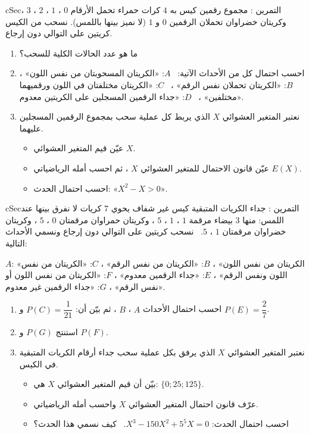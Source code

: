 \documentclass[12pt,a4paper]{article}
\newenvironment{BOX}[2]{\begin{otherlanguage}{english}\begin{arbox}{#1}{#2}}{\end{arbox}\end{otherlanguage}}
\newcounter{exo}
\newenvironment{tamrin}[1]{\stepcounter{exo}\begin{BOX}{cSec}{التمرين \theexo: #1}}{\end{BOX}}
\newenvironment{sq}{\begin{itemize}[leftmargin=2.4em,itemsep=3pt]}{\end{itemize}}
\newcommand{\qa}{\item[(أ)]}\newcommand{\qb}{\item[(ب)]}\newcommand{\qc}{\item[(جـ)]}\newcommand{\qd}{\item[(د)]}\newcommand{\qe}{\item[(هـ)]}
\begin{document}
\begin{tamrin}{مجموع رقمين}
كيس به $4$ كرات حمراء تحمل الأرقام $0$ ، $1$ ، $2$ ، $3$ ، وكريتان خضراوان تحملان الرقمين $0$ و $1$ (لا نميز بينها باللمس). نسحب من الكيس كريتين على التوالي دون إرجاع.
\begin{enumerate}
\item ما هو عدد الحالات الكلية للسحب؟
\item احسب احتمال كل من الأحداث الآتية: \ $A$: «الكريتان المسحوبتان من نفس اللون» ، \ $B$: «الكريتان تحملان نفس الرقم» ، \ $C$: «الكريتان مختلفتان في اللون ورقميهما مختلفين» ، \ $D$: «جداء الرقمين المسجلين على الكريتين معدوم».
\item نعتبر المتغير العشوائي $X$ الذي يربط كل عملية سحب بمجموع الرقمين المسجلين عليهما.
\begin{sq}
\qa عيّن قيم المتغير العشوائي $X$.
\qb عيّن قانون الاحتمال للمتغير العشوائي $X$ ، ثم احسب أمله الرياضياتي $E(X)$.
\qc احسب احتمال الحدث: «$X^2-X>0$».
\end{sq}
\end{enumerate}
\end{tamrin}

\begin{tamrin}{جداء الكريات المتبقية}
كيس غير شفاف يحوي $7$ كريات لا نفرق بينها عند اللمس: منها $3$ بيضاء مرقمة $1$ ، $1$ ، $5$ ، وكريتان حمراوان مرقمتان $0$ ، $5$ ، وكريتان خضراوان مرقمتان $1$ ، $5$. \ نسحب كريتين على التوالي دون إرجاع ونسمي الأحداث التالية:\par
$A$: «الكريتان من نفس اللون» ، $B$: «الكريتان من نفس الرقم» ، $C$: «الكريتان من نفس اللون ونفس الرقم» ، $E$: «جداء الرقمين معدوم» ، $F$: «الكريتان من نفس اللون أو نفس الرقم» ، $G$: «جداء الرقمين غير معدوم».
\begin{enumerate}
\item احسب احتمال الأحداث $A$ ، $B$ ، ثم بيّن أن: $P(C)=\dfrac{1}{21}$ و $P(E)=\dfrac27$.
\item استنتج $P(G)$ و $P(F)$.
\item نعتبر المتغير العشوائي $X$ الذي يرفق بكل عملية سحب جداء أرقام الكريات المتبقية في الكيس.
\begin{sq}
\qa بيّن أن قيم المتغير العشوائي $X$ هي: $\{0;25;125\}$.
\qb عرّف قانون احتمال المتغير العشوائي $X$ واحسب أمله الرياضياتي.
\qc احسب احتمال الحدث: $X^3-150X^2+5^5X=0$. \ كيف نسمي هذا الحدث؟
\end{sq}
\end{enumerate}
\end{tamrin}
\end{document}
